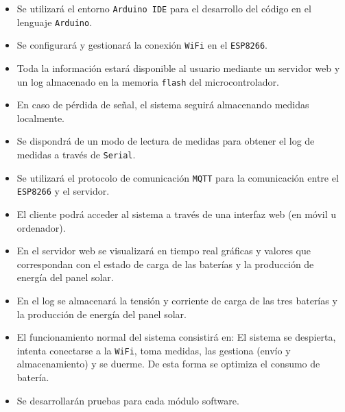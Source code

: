 \begin{itemize}
    \item Se utilizará el entorno \texttt{Arduino IDE} para el desarrollo del código en el lenguaje \texttt{Arduino}.
    \item Se configurará y gestionará la conexión \texttt{WiFi} en el \texttt{ESP8266}.
    \item Toda la información estará disponible al usuario mediante un servidor web y un log almacenado en la memoria \texttt{flash} del microcontrolador.
    \item En caso de pérdida de señal, el sistema seguirá almacenando medidas localmente.
    \item Se dispondrá de un modo de lectura de medidas para obtener el log de medidas a través de \texttt{Serial}.
    \item Se utilizará el protocolo de comunicación \texttt{MQTT} para la comunicación entre el \texttt{ESP8266} y el servidor.
    \item El cliente podrá acceder al sistema a través de una interfaz web (en móvil u ordenador).
    \item En el servidor web se visualizará en tiempo real gráficas y valores que correspondan con el estado de carga de las baterías y la producción de energía del panel solar.
    \item En el log se almacenará la tensión y corriente de carga de las tres baterías y la producción de energía del panel solar.
    \item El funcionamiento normal del sistema consistirá en: El sistema se despierta, intenta conectarse a la \texttt{WiFi}, toma medidas, las gestiona (envío y almacenamiento) y se duerme. De esta forma se optimiza el consumo de batería.
    \item Se desarrollarán pruebas para cada módulo software.
\end{itemize}
